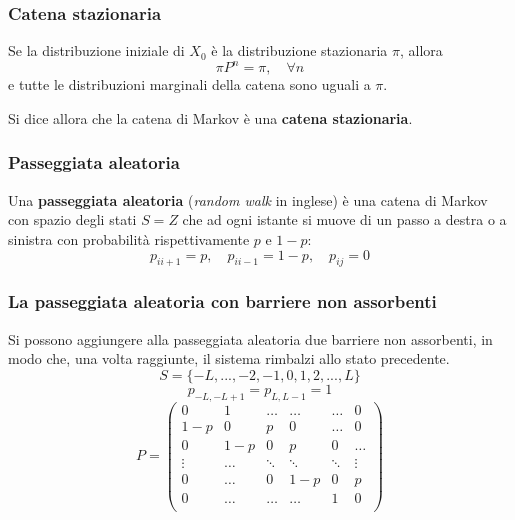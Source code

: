 \subsubsection{Catena stazionaria}
\begin{tcolorbox}
Se la distribuzione iniziale di \(X_0\) è la distribuzione stazionaria \(\pi\), allora
\[\pi P^n =\pi,\quad \forall n\]
e tutte le distribuzioni marginali della catena sono uguali a \(\pi\).

Si dice allora che la catena di Markov è una \textbf{catena stazionaria}.
\end{tcolorbox}

\subsubsection{Passeggiata aleatoria}
\begin{tcolorbox}
Una \textbf{passeggiata aleatoria} (\textit{random walk} in inglese) è una catena di Markov con spazio degli stati \(S = Z\) che ad ogni istante si muove di un passo a destra o a sinistra con probabilità rispettivamente \(p\) e \(1 - p\):
\[p_{ii + 1} = p, \quad p_{ii - 1} = 1 - p, \quad p_{ij} = 0\]
\end{tcolorbox}

\subsubsection{La passeggiata aleatoria con barriere non assorbenti}
Si possono aggiungere alla passeggiata aleatoria due barriere non assorbenti, in modo che, una volta raggiunte, il sistema rimbalzi allo stato precedente.
\[S = \{-L,...,-2,-1,0,1,2,...,L\}\]
\[p_{-L,-L+1} = p_{L,L-1} =1\]
\[
P = \begin{pmatrix}
0 & 1 & \hdots & \hdots & \hdots & 0\\
1-p & 0 & p & 0 & \hdots & 0\\
0 & 1-p & 0 & p & 0 & \hdots\\
\vdots & \hdots & \ddots & \ddots & \ddots & \vdots\\
0 & \hdots & 0 & 1-p & 0 & p\\
0 & \hdots & \hdots & \hdots & 1 & 0\\
\end{pmatrix}
\]

